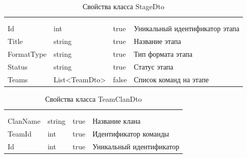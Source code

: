 \begin{xltabular}{\textwidth}{|X|X|X|X|}
	\caption{Свойства класса StageDto}\label{table:StageDto}\\ \hline
	 &  &  &  \\ \hline
	 &  &  &  \\ \hline
	\endfirsthead
	 \hline
	 &  &  &  \\ \hline
	\endhead
	Id & int & true & Уникальный идентификатор этапа \\ \hline
	Title & string & true & Название этапа \\ \hline
	FormatType & string & true & Тип формата этапа \\ \hline
	Status & string & true & Статус этапа \\ \hline
	Teams & List<TeamDto> & false & Список команд на этапе \\ \hline
\end{xltabular}

\begin{xltabular}{\textwidth}{|X|X|X|X|}
	\caption{Свойства класса TeamClanDto}\label{table:TeamClanDto}\\ \hline
	 &  &  &  \\ \hline
	 &  &  &  \\ \hline
	\endfirsthead
	 \hline
	 &  &  &  \\ \hline
	\endhead
	ClanName & string & true & Название клана \\ \hline
	TeamId & int & true & Идентификатор команды \\ \hline
	Id & int & true & Уникальный идентификатор \\ \hline
\end{xltabular}

